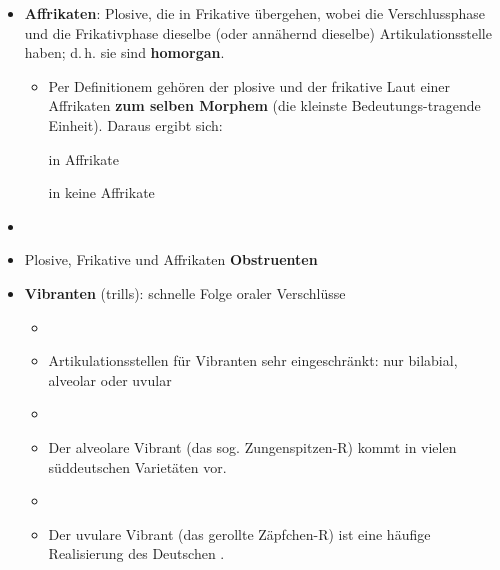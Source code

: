 
\begin{frame}

		\begin{itemize}
			\item \textbf{Affrikaten}: Plosive, die in Frikative übergehen, wobei die Verschlussphase und die Frikativphase dieselbe (oder annähernd dieselbe) Artikulationsstelle haben; d.\,h. sie sind \textbf{homorgan}.

			\ea \textipa{[ \t{pf} , \t{ts} , \t{tS} , \t{dZ} ]}
			\z

			\begin{itemize}
				\item Per Definitionem gehören der plosive und der frikative Laut einer Affrikaten \textbf{zum selben Morphem} (die kleinste Bedeutungs-tragende Einheit). Daraus ergibt sich:

				\ea \textipa{[ \t{ts} ]} in  \ras Affrikate
				\z
				
				\ea \textipa{[ ts ]} in  \ras keine Affrikate
				\z

			\end{itemize}
		
		\item[]
		\item Plosive, Frikative und Affrikaten \ras \textbf{Obstruenten}
	\end{itemize}
	
\end{frame}



\begin{frame}

		\begin{itemize}
			\item \textbf{Vibranten} (trills): schnelle Folge oraler Verschlüsse
			\begin{itemize}
				\item[]
				\item Artikulationsstellen für Vibranten sehr eingeschränkt: nur bilabial, alveolar oder uvular
				\item[]
				\item Der alveolare Vibrant \textipa{[ r ]} (das sog. Zungenspitzen-R) kommt in vielen süddeutschen Varietäten vor.
				\item[]
				\item Der uvulare Vibrant \textipa{[ \textscr\ ]} (das gerollte Zäpfchen-R) ist eine häufige Realisierung des Deutschen .
			\end{itemize}
			 
	\end{itemize}
	
\end{frame}


